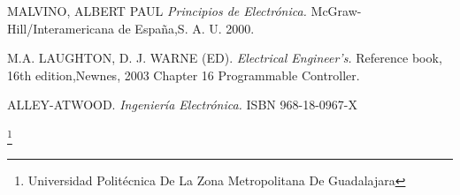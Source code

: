 \documentclass[11pt,a4paper]{article}
\begin{document}

\begin{thebibliography}{X}
 \textsc{MALVINO, ALBERT PAUL} \textit{Principios de Electrónica.} McGraw-Hill/Interamericana de España,S. A. U. 2000.

 \textsc{M.A. LAUGHTON, D. J. WARNE (ED).} \textit{Electrical Engineer's.} 
Reference book, 16th edition,Newnes, 2003 Chapter 16 Programmable Controller.


 \textsc{ALLEY-ATWOOD.} \textit{Ingeniería Electrónica.} 
ISBN 968-18-0967-X
\end{thebibliography}


\footnote{Universidad Politécnica De La Zona Metropolitana De Guadalajara}
\end{document}
